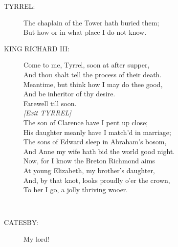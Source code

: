 \documentclass{article}
\begin{document}
\begin{description}
\item[TYRREL:] 
\hspace{1pt}The chaplain of the Tower hath buried them;\\
\hspace{1pt}But how or in what place I do not know.\\
\end{description}
\begin{description}
\item[KING RICHARD III:] 
\hspace{1pt}Come to me, Tyrrel, soon at after supper,\\
\hspace{1pt}And thou shalt tell the process of their death.\\
\hspace{1pt}Meantime, but think how I may do thee good,\\
\hspace{1pt}And be inheritor of thy desire.\\
\hspace{1pt}Farewell till soon.\\
{\it [Exit TYRREL]}\\
\hspace{1pt}The son of Clarence have I pent up close;\\
\hspace{1pt}His daughter meanly have I match'd in marriage;\\
\hspace{1pt}The sons of Edward sleep in Abraham's bosom,\\
\hspace{1pt}And Anne my wife hath bid the world good night.\\
\hspace{1pt}Now, for I know the Breton Richmond aims\\
\hspace{1pt}At young Elizabeth, my brother's daughter,\\
\hspace{1pt}And, by that knot, looks proudly o'er the crown,\\
\hspace{1pt}To her I go, a jolly thriving wooer.\\
\end{description}
\\
\begin{description}
\item[CATESBY:] 
\hspace{1pt}My lord!\\
\end{description}
\end{document}
